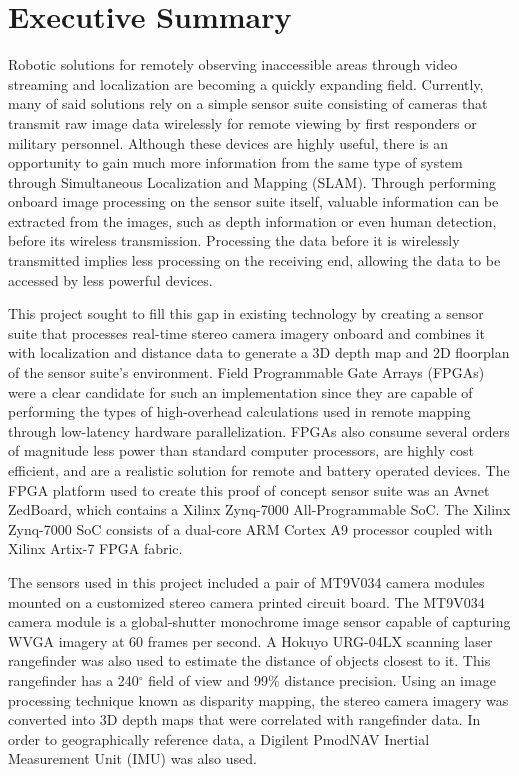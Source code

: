 {}
\section*{Executive Summary}

Robotic solutions for remotely observing inaccessible areas through video streaming and localization are becoming a quickly expanding field. Currently, many of said solutions rely on a simple sensor suite consisting of cameras that transmit raw image data wirelessly for remote viewing by first responders or military personnel. Although these devices are highly useful, there is an opportunity to gain much more information from the same type of system through Simultaneous Localization and Mapping (SLAM). Through performing onboard image processing on the sensor suite itself, valuable information can be extracted from the images, such as depth information or even human detection, before its wireless transmission. Processing the data before it is wirelessly transmitted implies less processing on the receiving end, allowing the data to be accessed by less powerful devices.
\par
This project sought to fill this gap in existing technology by creating a sensor suite that processes real-time stereo camera imagery onboard and combines it with localization and distance data to generate a 3D depth map and 2D floorplan of the sensor suite's environment. Field Programmable Gate Arrays (FPGAs) were a clear candidate for such an implementation since they are capable of performing the types of high-overhead calculations used in remote mapping through low-latency hardware parallelization. FPGAs also consume several orders of magnitude less power than standard computer processors, are highly cost efficient, and are a realistic solution for remote and battery operated devices. The FPGA platform used to create this proof of concept sensor suite was an Avnet ZedBoard, which contains a Xilinx Zynq-7000 All-Programmable SoC. The Xilinx Zynq-7000 SoC consists of a dual-core ARM Cortex A9 processor coupled with Xilinx Artix-7 FPGA fabric.
\par
The sensors used in this project included a pair of MT9V034 camera modules mounted on a customized stereo camera printed circuit board. The MT9V034 camera module is a global-shutter monochrome image sensor capable of capturing WVGA imagery at 60 frames per second. A Hokuyo URG-04LX scanning laser rangefinder was also used to estimate the distance of objects closest to it. This rangefinder has a 240$^\circ$ field of view and 99\% distance precision. Using an image processing technique known as disparity mapping, the stereo camera imagery was converted into 3D depth maps that were correlated with rangefinder data. In order to geographically reference data, a Digilent PmodNAV Inertial Measurement Unit (IMU) was also used. 
